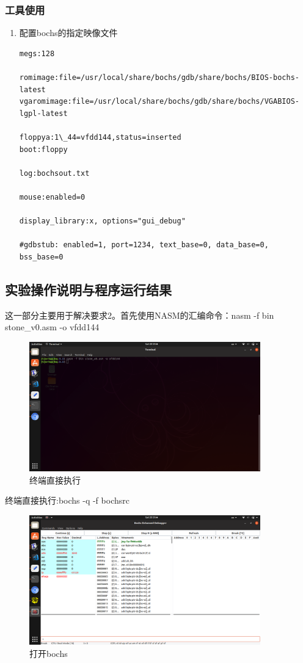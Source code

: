 \documentclass[a4paper,11pt,UTF8]{ctexart}
\newcommand{\bottomcaption}{%
\setlength{\abovecaptionskip}{6pt}%
\setlength{\belowcaptionskip}{6pt}%
\caption}
\begin{document}
\subsubsection{工具使用}

	\begin{enumerate}
		\item 配置bochs的指定映像文件
		
	\begin{lstlisting}[caption={bochsrc},tabsize=4,basicstyle=\footnotesize,captionpos=b]
megs:128

romimage:file=/usr/local/share/bochs/gdb/share/bochs/BIOS-bochs-latest
vgaromimage:file=/usr/local/share/bochs/gdb/share/bochs/VGABIOS-lgpl-latest

floppya:1\_44=vfdd144,status=inserted
boot:floppy

log:bochsout.txt

mouse:enabled=0

display_library:x, options="gui_debug"

#gdbstub: enabled=1, port=1234, text_base=0, data_base=0, bss_base=0
	\end{lstlisting}
	
	
		
		
	\end{enumerate}
\subsection{实验操作说明与程序运行结果}
	这一部分主要用于解决要求2。首先使用NASM的汇编命令：nasm -f bin stone\_v0.asm -o vfdd144

	\begin{figure}[htbp]
		\centering
		\includegraphics[width=10cm]{Screenshot from 2019-03-23 22-23-16.png}
		\bottomcaption{终端直接执行}
	\end{figure}
	终端直接执行:bochs -q -f bochsrc

	\begin{figure}[htbp]
		\centering
		\includegraphics[width=10cm]{Screenshot from 2019-03-23 22-23-35.png}
		\bottomcaption{打开bochs}
	\end{figure}
\end{document}
